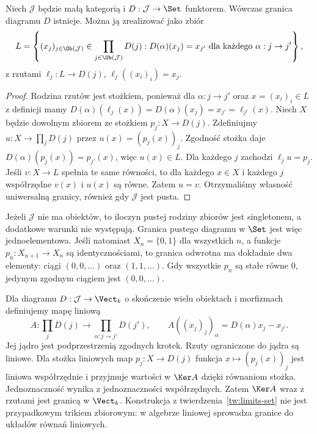 \begin{twierdzenie}\label{tw:limits-set}
Niech $\mathcal J$ będzie małą kategorią i $D:\mathcal J\to\Set$ funktorem. Wówczas granica diagramu $D$ istnieje. Można ją zrealizować jako zbiór
\[
L=\left\{(x_j)_{j\in\Ob(\mathcal J)}\in\prod_{j\in\Ob(\mathcal J)}D(j):
D(\alpha)(x_j)=x_{j'}\ \text{dla każdego }\alpha:j\to j'\right\},
\]
z rzutami $\ell_j:L\to D(j)$, $\ell_j((x_i)_i)=x_j$.
\end{twierdzenie}
\begin{proof}
Rodzina rzutów jest stożkiem, ponieważ dla $\alpha:j\to j'$ oraz $x=(x_i)_i\in L$ z definicji mamy $D(\alpha)(\ell_j(x))=D(\alpha)(x_j)=x_{j'}=\ell_{j'}(x)$. Niech $X$ będzie dowolnym zbiorem ze stożkiem $p_j:X\to D(j)$. Zdefiniujmy $u:X\to\prod_jD(j)$ przez $u(x)=(p_j(x))_j$. Zgodność stożka daje $D(\alpha)(p_j(x))=p_{j'}(x)$, więc $u(x)\in L$. Dla każdego $j$ zachodzi $\ell_ju=p_j$. Jeśli $v:X\to L$ spełnia te same równości, to dla każdego $x\in X$ i każdego $j$ współrzędne $v(x)$ i $u(x)$ są równe. Zatem $u=v$. Otrzymaliśmy własność uniwersalną granicy, również gdy $\mathcal J$ jest pusta.
\end{proof}

\begin{przyklad}
Jeżeli $\mathcal J$ nie ma obiektów, to iloczyn pustej rodziny zbiorów jest singletonem, a dodatkowe warunki nie występują. Granica pustego diagramu w $\Set$ jest więc jednoelementowa. Jeśli natomiast $X_n=\{0,1\}$ dla wszystkich $n$, a funkcje $p_n:X_{n+1}\to X_n$ są identycznościami, to granica odwrotna ma dokładnie dwa elementy: ciągi $(0,0,\ldots)$ oraz $(1,1,\ldots)$. Gdy wszystkie $p_n$ są stałe równe $0$, jedynym zgodnym ciągiem jest $(0,0,\ldots)$.
\end{przyklad}

\begin{przyklad}
Dla diagramu $D:\mathcal J\to\Vect_k$ o skończenie wielu obiektach i morfizmach definiujemy mapę liniową
\[
A:\prod_jD(j)\longrightarrow\prod_{\alpha:j\to j'}D(j'),
\qquad
A((x_j)_j)_\alpha=D(\alpha)x_j-x_{j'}.
\]
Jej jądro jest podprzestrzenią zgodnych krotek. Rzuty ograniczone do jądra są liniowe. Dla stożka liniowych map $p_j:X\to D(j)$ funkcja $x\mapsto(p_j(x))_j$ jest liniowa współrzędnie i przyjmuje wartości w $\Ker A$ dzięki równaniom stożka. Jednoznaczność wynika z jednoznaczności współrzędnych. Zatem $\Ker A$ wraz z rzutami jest granicą w $\Vect_k$. Konstrukcja z twierdzenia~\ref{tw:limits-set} nie jest przypadkowym trikiem zbiorowym: w algebrze liniowej sprowadza granice do układów równań liniowych.
\end{przyklad}


